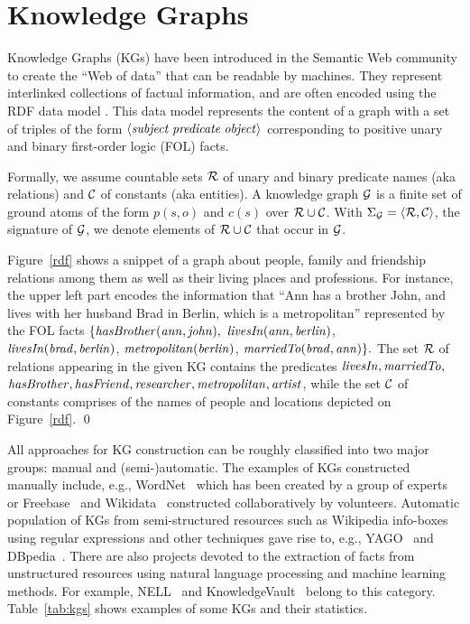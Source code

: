 \section{Knowledge Graphs}
\label{sec:kgs}

Knowledge Graphs (KGs) have been introduced in the Semantic Web community to create the ``Web of data'' that can be readable by machines. They represent interlinked collections of factual information, and are often encoded using the RDF data model \cite{rdf2004}. This data model represents the content of a graph with a set of triples of the form $\langle\mathit{subject\;predicate\;object}\rangle$ corresponding to positive unary and binary first-order logic (FOL) facts.  

Formally, we assume countable sets $\mathcal{R}$ of unary and binary predicate names (aka relations) and $\mathcal{C}$ of constants (aka entities). A knowledge graph $\mathcal{G}$ is a finite set of ground atoms of the form $p(s,o)$ and $c(s)$ over $\mathcal{R} \cup \mathcal{C}$. With $\Sigma_{\mathcal{G}}=\langle\mathcal{R},\mathcal{C}\rangle$, the signature of $\mathcal{G}$, we denote elements of $\mathcal{R} \cup \mathcal{C}$ that occur in $\mathcal{G}$.

\begin{example} Figure~\ref{rdf} shows a snippet of a graph about people, family and friendship %
relations among them as well as their living places and professions. For instance, the upper left part encodes the information that ``Ann has a brother John, and lives with her husband Brad in Berlin, which is a metropolitan'' represented by the FOL facts $\{\mathit{hasBrother(ann, john),}$ $\mathit{ livesIn(ann, berlin)}$, \\$\mathit{livesIn(brad, berlin)}$, $\mathit{metropolitan(berlin)}$, $\mathit{marriedTo(brad, ann)}\}.$
The set $\mathcal{R}$ of relations appearing in the given KG contains the predicates $\mathit{livesIn,marriedTo,}$\\$\mathit{hasBrother,hasFriend,researcher,metropolitan,artist}$, while the set $\mathcal{C}$ of constants comprises of the names of people and locations depicted on Figure~\ref{rdf}. \qed
\end{example}



All approaches for KG construction can be roughly classified into two major groups: manual and (semi-)automatic. The examples of KGs constructed manually include, e.g., WordNet~\cite{wordnet} which has been created by a group of experts or Freebase~\cite{Freebase} and Wikidata~\cite{wikidata} constructed collaboratively by volunteers. 
Automatic population of KGs from semi-structured resources such as Wikipedia info-boxes using regular expressions and other techniques gave rise to, e.g., YAGO~\cite{yago} and DBpedia~\cite{dbpedia}. 
There are also projects 
devoted to the extraction of facts from unstructured resources using natural language processing and machine learning methods.  
For example, NELL~\cite{nell} and KnowledgeVault~\cite{KnowledgeVault} belong to this category. Table~\ref{tab:kgs} shows examples of some KGs and their statistics.

